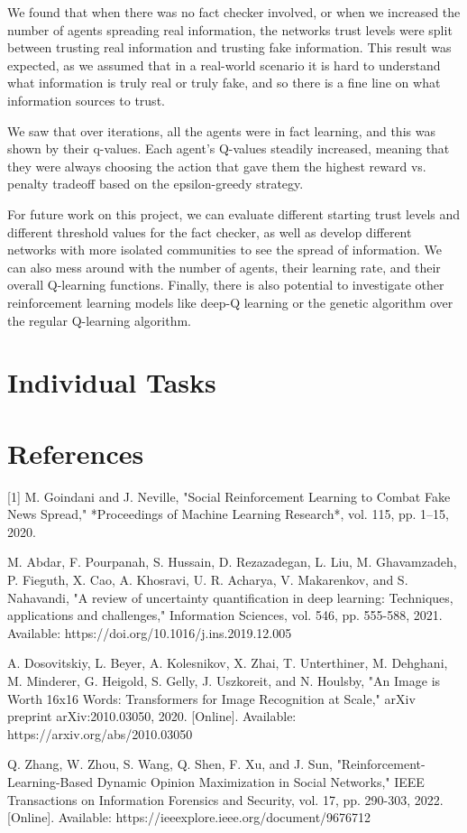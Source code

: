 \documentclass[twoside]{article}
\begin{document}
We found that when there was no fact checker involved, or when we increased the number of agents spreading real information, the networks trust levels were split between trusting real information and trusting fake information. This result was expected, as we assumed that in a real-world scenario it is hard to understand what information is truly real or truly fake, and so there is a fine line on what information sources to trust.

We saw that over iterations, all the agents were in fact learning, and this was shown by their q-values. Each agent's Q-values steadily increased, meaning that they were always choosing the action that gave them the highest reward vs. penalty tradeoff based on the epsilon-greedy strategy.

For future work on this project, we can evaluate different starting trust levels and different threshold values for the fact checker, as well as develop different networks with more isolated communities to see the spread of information. We can also mess around with the number of agents, their learning rate, and their overall Q-learning functions. Finally, there is also potential to investigate other reinforcement learning models like deep-Q learning or the genetic algorithm over the regular Q-learning algorithm.

\section{Individual Tasks}


\section{References}
[1] M. Goindani and J. Neville, "Social Reinforcement Learning to Combat Fake News Spread," *Proceedings of Machine Learning Research*, vol. 115, pp. 1–15, 2020.

\sloppy
[2] M. Abdar, F. Pourpanah, S. Hussain, D. Rezazadegan, L. Liu, M. Ghavamzadeh, P. Fieguth, X. Cao, A. Khosravi, U. R. Acharya, V. Makarenkov, and S. Nahavandi, "A review of uncertainty quantification in deep learning: Techniques, applications and challenges," Information Sciences, vol. 546, pp. 555-588, 2021. Available: https://doi.org/10.1016/j.ins.2019.12.005

\sloppy
[3] A. Dosovitskiy, L. Beyer, A. Kolesnikov, X. Zhai, T. Unterthiner, M. Dehghani, M. Minderer, G. Heigold, S. Gelly, J. Uszkoreit, and N. Houlsby, "An Image is Worth 16x16 Words: Transformers for Image Recognition at Scale," arXiv preprint arXiv:2010.03050, 2020. [Online]. Available: https://arxiv.org/abs/2010.03050

\sloppy
[4] Q. Zhang, W. Zhou, S. Wang, Q. Shen, F. Xu, and J. Sun, "Reinforcement-Learning-Based Dynamic Opinion Maximization in Social Networks," IEEE Transactions on Information Forensics and Security, vol. 17, pp. 290-303, 2022. [Online]. Available: https://ieeexplore.ieee.org/document/9676712


%
\end{document}
